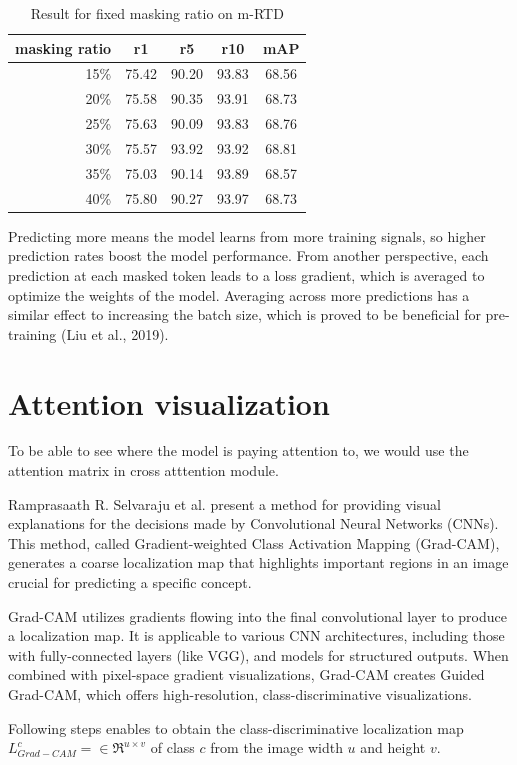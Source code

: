 \begin{table}[htbp]
  \centering
  \caption{Result for fixed masking ratio on m-RTD}
  \begin{tabular}{rcccc}
    masking ratio & r1 & r5 & r10 & mAP \\ \hline
    15\% & 75.42 & 90.20 & 93.83 & 68.56 \\
    20\% & 75.58 & 90.35 & 93.91 & 68.73 \\
    25\% & 75.63 & 90.09 & 93.83 & 68.76 \\
    30\% & 75.57 & 93.92 & 93.92 & 68.81 \\
    35\% & 75.03 & 90.14 & 93.89 & 68.57 \\
    40\% & 75.80 & 90.27 & 93.97 & 68.73
  \end{tabular}
\end{table}

Predicting more means the model learns from more training signals, so higher prediction rates boost the model performance. From another perspective, each prediction at each masked token leads to a loss gradient, which is averaged to optimize the weights of the model. Averaging across more predictions has a similar effect to increasing the batch size, which is proved to be beneficial for pre-training (Liu et al., 2019). 

\section{Attention visualization}
To be able to see where the model is paying attention to, we would use the attention matrix in cross atttention module. 

Ramprasaath R. Selvaraju et al. present a method for providing visual explanations for the decisions made by Convolutional Neural Networks (CNNs). This method, called Gradient-weighted Class Activation Mapping (Grad-CAM), generates a coarse localization map that highlights important regions in an image crucial for predicting a specific concept.

Grad-CAM utilizes gradients flowing into the final convolutional layer to produce a localization map. It is applicable to various CNN architectures, including those with fully-connected layers (like VGG), and models for structured outputs. When combined with pixel-space gradient visualizations, Grad-CAM creates Guided Grad-CAM, which offers high-resolution, class-discriminative visualizations.

Following steps enables to obtain the class-discriminative localization map $L^c_{Grad-CAM} = \in\Re^{u \times v}$ of class $c$ from the image width $u$ and height $v$. 


